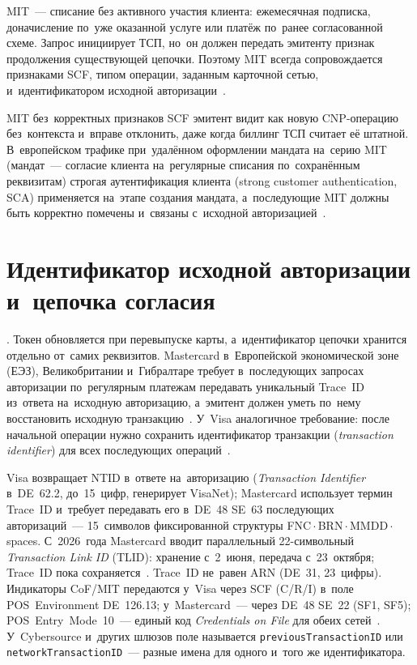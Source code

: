 MIT~--- списание без активного участия клиента: ежемесячная подписка,
доначисление по~уже оказанной услуге или платёж по~ранее согласованной схеме.
Запрос инициирует ТСП, но~он должен передать эмитенту признак продолжения
существующей цепочки. Поэтому MIT всегда сопровождается признаками SCF, типом
операции, заданным карточной сетью, и~идентификатором исходной
авторизации~\cite{mc-tpr,cybs-mc-subscription-mit}.

MIT без~корректных признаков SCF эмитент видит как новую CNP-операцию
без~контекста и~вправе отклонить, даже когда биллинг ТСП считает её штатной. В~европейском
трафике при~удалённом оформлении мандата на~серию
MIT (мандат~--- согласие клиента на~регулярные списания по~сохранённым
реквизитам) строгая аутентификация клиента (strong customer authentication,
SCA) применяется на~этапе создания мандата, а~последующие MIT должны быть
корректно помечены и~связаны с~исходной авторизацией~\cite{eba-mit-qa,mc-tpr}.

\section{Идентификатор исходной авторизации и~цепочка согласия}\label{sec:subscriptions-ntid}

. Токен обновляется при перевыпуске карты, а~идентификатор
цепочки хранится отдельно от~самих реквизитов. Mastercard в~Европейской
экономической зоне (ЕЭЗ), Великобритании и~Гибралтаре требует в~последующих
запросах авторизации по~регулярным платежам передавать уникальный Trace~ID
из~ответа на~исходную авторизацию, а~эмитент должен уметь по~нему восстановить
исходную транзакцию~\cite{mc-tpr}. У~Visa аналогичное требование: после
начальной операции нужно сохранить идентификатор транзакции
(\textit{transaction identifier}) для всех последующих
операций~\cite{cybs-initial-transactions}.

Visa возвращает NTID в~ответе на~авторизацию (\textit{Transaction Identifier}
в~DE~62.2, до~15~цифр, генерирует VisaNet); Mastercard использует термин
Trace~ID и~требует передавать его в~DE~48 SE~63 последующих авторизаций~---
15~символов фиксированной структуры
FNC\,$\cdot$\,BRN\,$\cdot$\,MMDD\,$\cdot$\,spaces. С~2026~года Mastercard
вводит параллельный 22-символьный \textit{Transaction Link ID}
(TLID): хранение с~2~июня, передача с~23~октября; Trace~ID пока
сохраняется~\cite{mc-tpr,cybs-initial-transactions,mc-an11418-tlid}. Trace~ID
не~равен ARN (DE~31, 23~цифры). Индикаторы CoF/MIT передаются у~Visa через SCF
(C/R/I) в~поле POS~Environment DE~126.13; у~Mastercard~--- через DE~48 SE~22 (SF1,
SF5); POS~Entry~Mode~10~--- единый код \textit{Credentials on File} для обеих
сетей~\cite{visa-vbs-10,visa-ai11237,mc-spme-2025}. У~Cybersource и~других шлюзов поле
называется \texttt{previousTransactionID} или \texttt{networkTransactionID}~---
разные имена для одного и~того же идентификатора.

